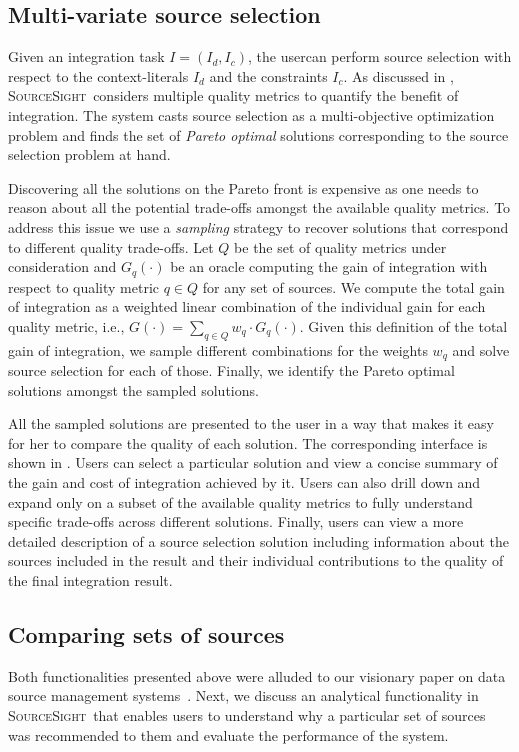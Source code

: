 \documentclass{vldb}
\newcommand\system{\textsc{SourceSight}}
\begin{document}
\subsection{Multi-variate source selection}
\label{sec:sourcesel}
Given an integration task $I = (I_d,I_c)$, the usercan perform source selection with respect to the context-literals $I_d$ and the constraints $I_c$. As discussed in , \system~considers multiple quality metrics to quantify the benefit of integration. The system casts source selection as a multi-objective optimization problem and finds the set of {\em Pareto optimal} solutions corresponding to the source selection problem at hand. 

Discovering all the solutions on the Pareto front is expensive as one needs to reason about all the potential trade-offs amongst the available quality metrics. To address this issue we use a {\em sampling} strategy to recover solutions that correspond to different quality trade-offs. Let $Q$ be the set of quality metrics under consideration and $G_q(\cdot)$ be an oracle computing the gain of integration with respect to quality metric $q \in Q$ for any set of sources. We compute the total gain of integration as a weighted linear combination of the individual gain for each quality metric, i.e., $G(\cdot) = \sum_{q \in Q} w_q \cdot G_q(\cdot)$. Given this definition of the total gain of integration, we sample different combinations for the weights $w_q$ and solve source selection for each of those. Finally, we identify the Pareto optimal solutions amongst the sampled solutions. 

All the sampled solutions are presented to the user in a way that makes it easy for her to compare the quality of each solution. The corresponding interface is shown in . Users can select a particular solution and view a concise summary of the gain and cost of integration achieved by it. Users can also drill down and expand only on a subset of the available quality metrics to fully understand specific trade-offs across different solutions. Finally, users can view a more detailed description of a source selection solution including information about the sources included in the result and their individual contributions to the quality of the final integration result. 

\subsection{Comparing sets of sources}
\label{sec:extensions}
Both functionalities presented above were alluded to our visionary paper on data source management systems~\cite{rekatsinas:2015}. Next, we discuss an analytical functionality in \system~that enables users to understand why a particular set of sources was recommended to them and evaluate the performance of the system.
\end{document}

